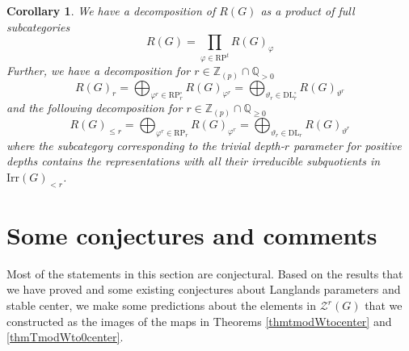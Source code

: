 \documentclass[11 pt]{article}
\numberwithin{equation}{subsection}
\newtheorem{corollary}[theorem]{Corollary}
\theoremstyle{definition}
\theoremstyle{remark}
\theoremstyle{conjecture}
\newcommand{\Irr}{\mathrm{Irr}}
\newcommand{\DL}{\mathrm{DL}}
\newcommand{\RP}{\mathrm{RP}}
\newcommand{\Z}{\mathbb Z}
\newcommand{\Q}{\mathbb Q}
\newcommand{\ZZ}{\mathcal{Z}}
\begin{document}
\begin{corollary}\label{corollary:decomprestricted and <r}
 We have a decomposition of $R(G)$ as a product of full subcategories 
    \begin{equation*}
        R(G) = \prod_{\varphi\in \RP^t}R(G)_\varphi
    \end{equation*}
    Further, we have a decomposition for $r \in \Z_{(p)}\cap \Q_{>0}$
    \begin{equation*}
        R(G)_r=\bigoplus_{\varphi^r\in \RP_r^\circ}R(G)_{\varphi^r}=\bigoplus_{\vartheta_r\in \DL_r^\circ}R(G)_{\vartheta^r}
    \end{equation*}
    and the following decomposition for $r \in \Z_{(p)}\cap \Q_{\geq0}$
    \begin{equation*}
        R(G)_{\leq r}=\bigoplus_{\varphi^r\in \RP_r}R(G)_{\varphi^r}=\bigoplus_{\vartheta_r\in \DL_r}R(G)_{\vartheta^r}
    \end{equation*}
    where the subcategory corresponding to the trivial depth-$r$ parameter for positive depths contains the representations with all their irreducible subquotients in $\Irr(G)_{<r}$.
\end{corollary}


    






    
  \section{Some conjectures and comments}\label{section:conjectures}  
Most of the statements in this section are conjectural. Based on the results that we have proved and some existing conjectures about Langlands parameters and stable center, we make some predictions about the elements in $\ZZ^r(G)$ that we constructed as the images of the maps in Theorems \ref{thmtmodWtocenter} and \ref{thmTmodWto0center}. \par
\end{document}
